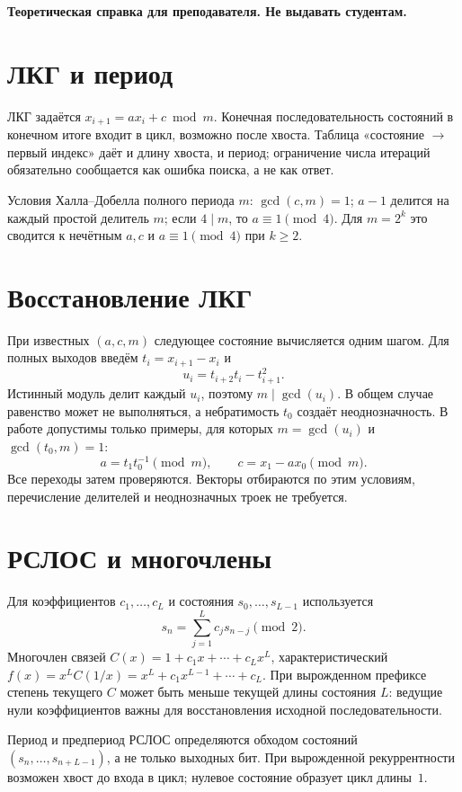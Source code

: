 \documentclass[12pt]{ca-capstone}
\begin{document}
\begin{center}\textbf{Теоретическая справка для преподавателя. Не выдавать студентам.}\end{center}

\section{ЛКГ и период}
ЛКГ задаётся $x_{i+1}=ax_i+c\bmod m$. Конечная последовательность состояний в конечном итоге
входит в цикл, возможно после хвоста. Таблица «состояние $\to$ первый индекс» даёт и длину
хвоста, и период; ограничение числа итераций обязательно сообщается как ошибка поиска, а не
как ответ.

Условия Халла--Добелла полного периода $m$: $\gcd(c,m)=1$; $a-1$ делится на каждый простой
делитель $m$; если $4\mid m$, то $a\equiv1\pmod4$. Для $m=2^k$ это сводится к нечётным $a,c$ и
$a\equiv1\pmod4$ при $k\ge2$.

\section{Восстановление ЛКГ}
При известных $(a,c,m)$ следующее состояние вычисляется одним шагом. Для полных выходов введём
$t_i=x_{i+1}-x_i$ и
\[
 u_i=t_{i+2}t_i-t_{i+1}^2.
\]
Истинный модуль делит каждый $u_i$, поэтому $m\mid\gcd(u_i)$. В общем случае равенство может не
выполняться, а небратимость $t_0$ создаёт неоднозначность. В работе допустимы только примеры,
для которых $m=\gcd(u_i)$ и $\gcd(t_0,m)=1$:
\[
 a=t_1t_0^{-1}\pmod m,\qquad c=x_1-ax_0\pmod m.
\]
Все переходы затем проверяются. Векторы отбираются по этим условиям, перечисление делителей и
неоднозначных троек не требуется.

\section{РСЛОС и многочлены}
Для коэффициентов $c_1,\ldots,c_L$ и состояния $s_0,\ldots,s_{L-1}$ используется
\[
 s_n=\sum_{j=1}^{L}c_j s_{n-j}\pmod2.
\]
Многочлен связей $C(x)=1+c_{1}x+\cdots+c_{L}x^{L}$, характеристический
$f(x)=x^{L}C(1/x)=x^{L}+c_{1}x^{L-1}+\cdots+c_{L}$. При вырожденном префиксе степень текущего $C$ может
быть меньше текущей длины состояния $L$: ведущие нули коэффициентов важны для восстановления
исходной последовательности.

Период и предпериод РСЛОС определяются обходом состояний $(s_n,\ldots,s_{n+L-1})$, а не только
выходных бит. При вырожденной рекуррентности возможен хвост до входа в цикл; нулевое состояние
образует цикл длины~$1$.
\end{document}
